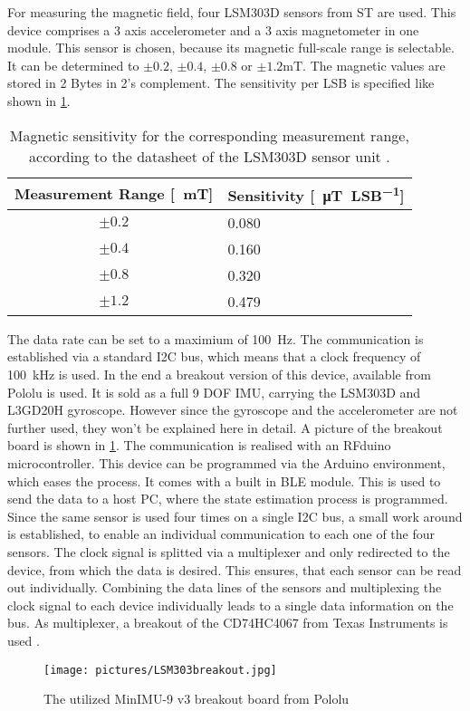 For measuring the magnetic field, four LSM303D sensors \cite{STlsm2012} from ST are used. This device comprises a 3 axis accelerometer and a 3 axis magnetometer in one module. This sensor is chosen, because its magnetic full-scale range is selectable. It can be determined to $ \pm 0.2$, $ \pm 0.4 $, $ \pm 0.8 $ or $ \pm 1.2\si{\milli\tesla} $. The magnetic values are stored in 2 Bytes in 2's complement. The sensitivity per \ac{LSB} is specified like shown in \ref{tab:magSensitivity}.
\begin{table}[h]
\centering
\begin{tabular}{c|l}
\textbf{Measurement Range [\SI{}{\milli\tesla}]} & \textbf{Sensitivity [\SI{}{\micro\tesla \per LSB}]} \\ \hline
$ \pm 0.2 $ & 0.080 \\ \hline
$ \pm 0.4 $ & 0.160 \\ \hline
$ \pm 0.8 $ & 0.320 \\ \hline
$ \pm 1.2 $ & 0.479 \\ %
\end{tabular}
\caption[Magnetic sensitivity]{Magnetic sensitivity for the corresponding measurement range, according to the datasheet of the LSM303D sensor unit \cite{STlsm2012}.}
\label{tab:magSensitivity}
\end{table}
The data rate can be set to a maximium of \SI{100}{\Hz}. The communication is established via a standard I2C bus, which means that a clock frequency of \SI{100}{\kilo \Hz} is used. In the end a breakout version of this device, available from Pololu \cite{pol2016} is used. It is sold as a full 9 \ac{DOF} IMU, carrying the LSM303D and L3GD20H gyroscope. However since the gyroscope and the accelerometer are not further used, they won't be explained here in detail. A picture of the breakout board is shown in \ref{fig:breakout}. The communication is realised with an RFduino microcontroller. This device can be programmed via the Arduino environment, which eases the process. It comes with a built in \ac{BLE} module. This is used to send the data to a host PC, where the state estimation process is programmed. Since the same sensor is used four times on a single I2C bus, a small work around is established, to enable an individual communication to each one of the four sensors. The clock signal is splitted via a multiplexer and only redirected to the device, from which the data is desired. This ensures, that each sensor can be read out individually. Combining the data lines of the sensors and multiplexing the clock signal to each device individually leads to a single data information on the bus. As multiplexer, a breakout of the CD74HC4067 from Texas Instruments is used \cite{TImux2003}.
\begin{figure}
\centering
\texttt{[image: pictures/LSM303breakout.jpg]}
\caption[Breakout board of sensor unit]
{The utilized MinIMU-9 v3 breakout board from Pololu \cite{pol2016}}
\label{fig:breakout}
\end{figure}


